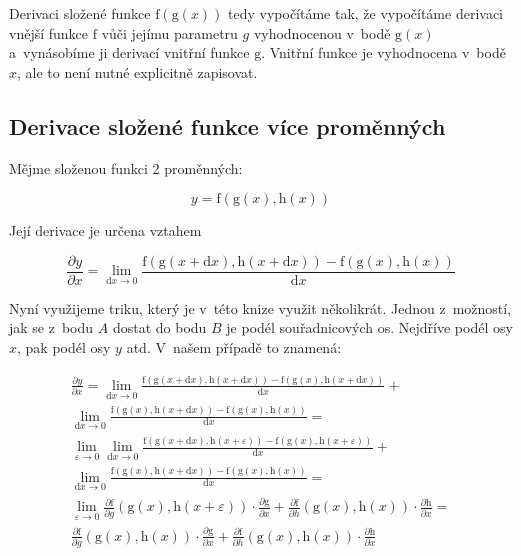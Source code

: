 Derivaci složené funkce \(\mathrm{f}(\mathrm{g}(x))\) tedy vypočítáme tak, že vypočítáme derivaci vnější funkce \(\mathrm{f}\) vůči jejímu parametru \(g\) vyhodnocenou v~bodě \(\mathrm{g}(x)\) a~vynásobíme ji derivací vnitřní funkce \(\mathrm{g}\). Vnitřní funkce je vyhodnocena v~bodě \(x\), ale to není nutné explicitně zapisovat.

\subsection{Derivace složené funkce více proměnných}

Mějme složenou funkci 2 proměnných:

\begin{equation}
y = \mathrm{f}(\mathrm{g}(x), \mathrm{h}(x))
\end{equation}

Její derivace je určena vztahem

\begin{equation}
\frac{\partial y}{\partial x} = \lim_{\mathrm{d}x \to 0} \frac{\mathrm{f}(\mathrm{g}(x + \mathrm{d}x), \mathrm{h}(x + \mathrm{d}x)) - \mathrm{f}(\mathrm{g}(x), \mathrm{h}(x))}{\mathrm{d}x}
\end{equation}

Nyní využijeme triku, který je v~této knize využit několikrát. Jednou z~možností, jak se z~bodu \(A\) dostat do bodu \(B\) je podél souřadnicových os. Nejdříve podél osy \(x\), pak podél osy \(y\) atd. V~našem případě to znamená:


\begin{equation}
\begin{split}
\frac{\partial y}{\partial x} = \lim_{\mathrm{d}x \to 0} \frac{\mathrm{f}(\mathrm{g}(x + \mathrm{d}x), \mathrm{h}(x + \mathrm{d}x)) - \mathrm{f}(\mathrm{g}(x), \mathrm{h}(x + \mathrm{d}x))}{\mathrm{d}x} + \\
\lim_{\mathrm{d}x \to 0} \frac{\mathrm{f}(\mathrm{g}(x), \mathrm{h}(x + \mathrm{d}x)) - \mathrm{f}(\mathrm{g}(x), \mathrm{h}(x))}{\mathrm{d}x} = \\
\lim_{\varepsilon \to 0} \lim_{\mathrm{d}x \to 0} \frac{\mathrm{f}(\mathrm{g}(x + \mathrm{d}x), \mathrm{h}(x + \varepsilon)) - \mathrm{f}(\mathrm{g}(x), \mathrm{h}(x + \varepsilon))}{\mathrm{d}x} + \\
\lim_{\mathrm{d}x \to 0} \frac{\mathrm{f}(\mathrm{g}(x), \mathrm{h}(x + \mathrm{d}x)) - \mathrm{f}(\mathrm{g}(x), \mathrm{h}(x))}{\mathrm{d}x} = \\
\lim_{\varepsilon \to 0} \frac{\partial \mathrm{f}}{\partial g}(\mathrm{g}(x), \mathrm{h}(x + \varepsilon)) \cdot \frac{\partial \mathrm{g}}{\partial x} +
\frac{\partial \mathrm{f}}{\partial h}(\mathrm{g}(x), \mathrm{h}(x)) \cdot \frac{\partial \mathrm{h}}{\partial x} = \\
\frac{\partial \mathrm{f}}{\partial g}(\mathrm{g}(x), \mathrm{h}(x)) \cdot \frac{\partial \mathrm{g}}{\partial x} +
\frac{\partial \mathrm{f}}{\partial h}(\mathrm{g}(x), \mathrm{h}(x)) \cdot \frac{\partial \mathrm{h}}{\partial x}
\end{split}
\end{equation}

